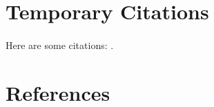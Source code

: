 \documentclass{article}
\begin{document}
    \section{Temporary Citations}
    \paragraph{}Here are some citations: \cite{Axelrod1981}\cite{Nowak1992}\cite{Hauert2004}\cite{Pacheco2005}\cite{Santos2006b}\cite{Santos2006a}\cite{Santos2005a}\cite{Santos2006c}\cite{Santos2005b}\cite{Eguiluz2005}\cite{Santos2006d}\cite{Fu2008}\cite{Traulsen2006}\cite{Watts1998}\cite{Barabasi1999}\cite{Amaral2000}\cite{Molloy1995}\cite{Maslov2002}.
    
    \section{References}
    
    
\end{document}
